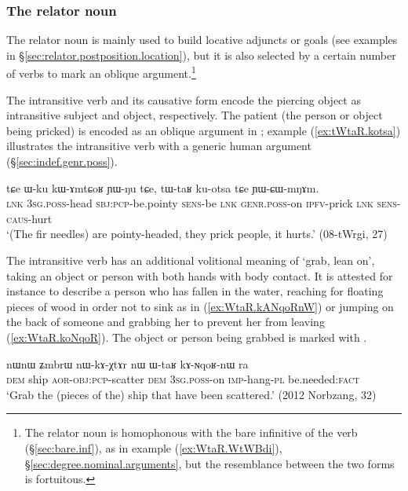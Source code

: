\subsubsection{The relator noun } \label{sec:WtaR} 
The relator noun  is mainly used to build locative adjuncts or goals (see examples in §\ref{sec:relator.postposition.location}), but it is also selected by a certain number of verbs to mark an oblique argument.\footnote{The relator noun  is homophonous with the bare infinitive  of the verb  (§\ref{sec:bare.inf}), as in example (\ref{ex:WtaR.WtWBdi}), §\ref{sec:degree.nominal.arguments}, but the resemblance between the two forms is fortuitous. }

The intransitive verb  and its causative form  encode the piercing object as intransitive subject and object, respectively. The patient (the person or object being pricked) is encoded as an oblique argument in ; example (\ref{ex:tWtaR.kotsa}) illustrates the intransitive verb  with a generic human argument (§\ref{sec:indef.genr.poss}).

\begin{exe}
\ex \label{ex:tWtaR.kotsa}
\gll tɕe ɯ-ku kɯ-ɤmtɕoʁ ɲɯ-ŋu tɕe, tɯ-taʁ ku-otsa tɕe ɲɯ-ɕɯ-mŋɤm. \\
\textsc{lnk} \textsc{3sg}.\textsc{poss}-head \textsc{sbj}:\textsc{pcp}-be.pointy \textsc{sens}-be \textsc{lnk} \textsc{genr}.\textsc{poss}-on \textsc{ipfv}-prick \textsc{lnk} \textsc{sens}-\textsc{caus}-hurt \\
\glt `(The fir needles) are pointy-headed, they prick people, it hurts.'  (08-tWrgi, 27)
\end{exe} 

The intransitive verb  has an additional volitional meaning of `grab, lean on', taking an object or person with both hands with body contact. It is attested for instance to describe a person who has fallen in the water, reaching for floating pieces of wood in order not to sink as in (\ref{ex:WtaR.kANqoRnW}) or jumping on the back of someone and grabbing her to prevent her from leaving (\ref{ex:WtaR.koNqoR}). The object or person being grabbed is marked with .

\begin{exe}
\ex \label{ex:WtaR.kANqoRnW}
 \gll nɯnɯ ʑmbrɯ nɯ-kɤ-χtɤr nɯ ɯ-taʁ kɤ-ɴqoʁ-nɯ ra   \\
 \textsc{dem} ship \textsc{aor}-\textsc{obj}:\textsc{pcp}-scatter \textsc{dem} \textsc{3sg}.\textsc{poss}-on \textsc{imp}-hang-\textsc{pl} be.needed:\textsc{fact} \\
 \glt `Grab the (pieces of the) ship that have been scattered.' (2012 Norbzang, 32)
\end{exe}

